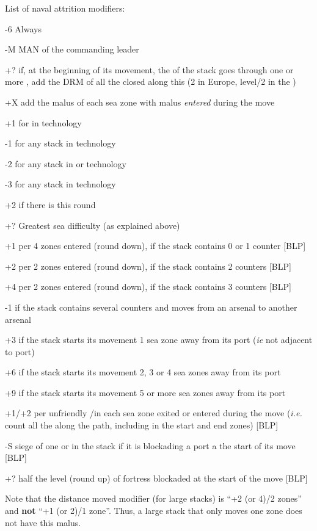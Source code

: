 List of naval attrition modifiers:
\begin{modlist}
\item[-6] Always
\item[-M] MAN of the commanding leader
\item[+?] if, at the beginning of its movement, the \LoS of the stack goes
  through one or more \StraitFort, add the DRM of all the closed \StraitFort
  along this \LoS (2 in Europe, level/2 in the \ROTW)
\item[+X] add the malus of each sea zone with malus \emph{entered} during the
  move
\item[+1] for \NWD in \TCAR technology
\item[-1] for any stack in \TBAT technology
\item[-2] for any stack in \TVE or \TTD technology
\item[-3] for any stack in \TSF technology
\item[+2] if there is  this round
\item[+?] Greatest sea difficulty (as explained above)
\item[+1] per 4 zones entered (round down), if the stack contains 0 or 1
  \FLEET counter [BLP]
\item[+2] per 2 zones entered (round down), if the stack contains 2 \FLEET
  counters [BLP]
\item[+4] per 2 zones entered (round down), if the stack contains 3 \FLEET
  counters [BLP]
\item[-1] if the stack contains several \FLEET counters and moves from an
  arsenal to another arsenal
\item[+3] if the stack starts its movement 1 sea zone away from its port
  (\emph{ie} not adjacent to port)
\item[+6] if the stack starts its movement 2, 3 or 4 sea zones away from its
  port
\item[+9] if the stack starts its movement 5 or more sea zones away from its
  port
\item[+1/+2] per unfriendly \corsaire\Facemoins/\Faceplus in each sea zone
  exited or entered during the move (\emph{i.e.} count all the \corsaire along
  the path, including in the start and end zones) [BLP]
\item[-S] siege of one \LeaderA or \LeaderE in the stack if it is blockading a
  port a the start of its move [BLP]
\item[+?] half the level (round up) of fortress blockaded at the start of the
  move [BLP]
\end{modlist}
Note that the distance moved modifier (for large stacks) is ``+2 (or 4)/2
zones'' and \textbf{not} ``+1 (or 2)/1 zone''. Thus, a large stack that only
moves one zone does not have this malus.

